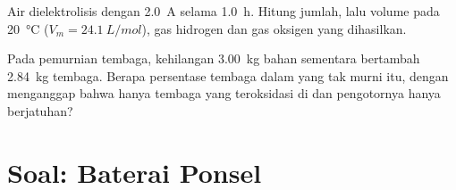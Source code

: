 \begin{exercise}[$\star\star\star$]\label{exo:g12:cells-and-electrolysis:14}
Air dielektrolisis dengan \qty{2.0}{A} selama \qty{1.0}{h}. Hitung
jumlah, lalu volume pada \qty{20}{\celsius} ($V_m = \qty{24.1}{L/mol}$),
gas hidrogen dan gas oksigen yang dihasilkan.
\end{exercise}

\begin{exercise}[$\star\star\star$]\label{exo:g12:cells-and-electrolysis:15}
Pada pemurnian tembaga,  kehilangan \qty{3.00}{kg} bahan sementara
 bertambah \qty{2.84}{kg} tembaga. Berapa persentase tembaga
dalam  yang tak murni itu, dengan menganggap bahwa hanya tembaga
yang teroksidasi di  dan pengotornya hanya berjatuhan?
\end{exercise}

\section{Soal: Baterai Ponsel}

